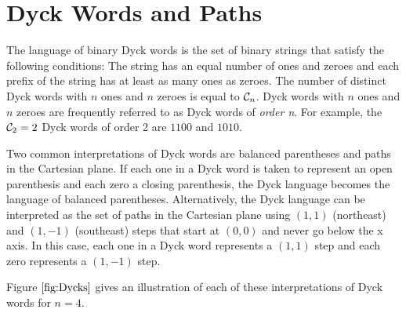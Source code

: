 \section{Dyck Words and Paths}

The language of binary Dyck words is the set of binary strings that satisfy the following conditions: The string has an equal number of ones and zeroes and each prefix of the string has at least as many ones as zeroes.  The number of distinct Dyck words with $n$ ones and $n$ zeroes is equal to $\mathcal{C}_n$.  Dyck words with $n$ ones and $n$ zeroes are frequently referred to as Dyck words of \emph{order n}.
For example, the $\mathcal{C}_2=2$ Dyck words of order 2 are $1100$ and $1010$.

Two common interpretations of Dyck words are balanced parentheses and paths in the Cartesian plane. If each one in a Dyck word is taken to represent an open parenthesis and each zero a closing parenthesis, the Dyck language becomes the language of balanced parentheses.  Alternatively, the Dyck language can be interpreted as the set of paths in the Cartesian plane using $(1,1)$ (northeast) and $(1,-1)$ (southeast) steps that start at $(0,0)$ and never go below the x axis. In this case, each one in a Dyck word represents a $(1,1)$ step and each zero represents a $(1,-1)$ step.

Figure $\ref{fig:Dycks}$ gives an illustration of each of these interpretations of Dyck words for $n=4$.


